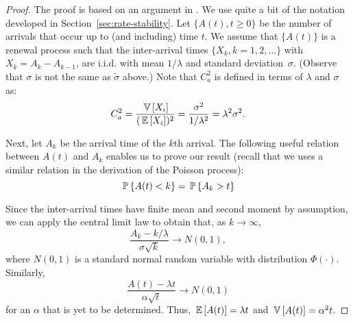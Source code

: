 \begin{proof}
  The proof is based on an argument in \cite{cox62:_renew_theor}. We
  use quite a bit of the notation developed in
  Section~\ref{sec:rate-stability}. Let $\{A(t), t\geq 0\}$ be the
  number of arrivals that occur up to (and including) time $t$. We
  assume that $\{A(t)\}$ is a renewal process such that the
  inter-arrival times $\{X_k, k=1, 2, \ldots\}$ with
  $X_k = A_{k}-A_{k-1}$, are i.i.d. with mean $1/\lambda$ and standard
  deviation~$\sigma$. (Observe that $\sigma$ is not the same as
  $\tilde \sigma$ above.) Note that $C_a^2$ is defined in terms of
  $\lambda$ and $\sigma$ as:
\begin{equation*}
C_a^2 = \frac{\V{X_i}}{(\E{X_i})^2} = \frac{\sigma^2}{1/\lambda^2} = \lambda^2 \sigma^2.
\end{equation*}

Next, let $A_k$ be the arrival time of the $k$th arrival. The
following useful relation between $A(t)$ and $A_k$ enables us to prove
our result (recall that we uses a similar relation in the derivation
of the Poisson process):
\begin{equation*}
\P{A(t) < k} = \P{A_k > t}
\end{equation*}

Since the inter-arrival times have finite mean and second moment by
assumption, we can apply the central limit law to obtain that, as
$k\to\infty$,
\begin{equation*}
\frac{A_k -k/\lambda}{\sigma \sqrt k} \to N(0,1),
\end{equation*}
where $N(0,1)$ is a standard normal random variable with
distribution $\Phi(\cdot)$.  Similarly,
%
\begin{equation*}
\frac{A(t) -\lambda t}{\alpha \sqrt t} \to N(0,1)
\end{equation*}
for an $\alpha$ that is yet to be determined. Thus,
$\E{A(t)} = \lambda t$ and $\V{A(t)}=\alpha^2 t$.


\end{proof}
